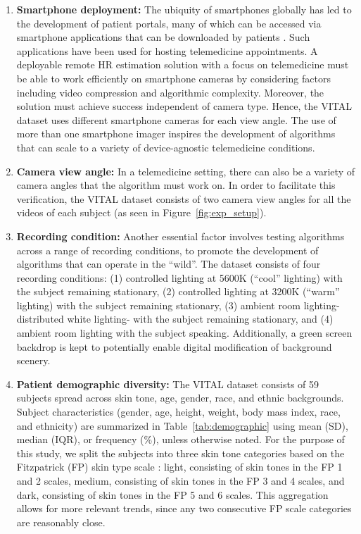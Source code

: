 \begin{enumerate}[label=(\roman*)]
    \item \textbf{Smartphone deployment:} The ubiquity of smartphones globally has led to the development of patient portals, many of which can be accessed via smartphone applications that can be downloaded by patients \cite{mosa_systematic_2012,ventola_mobile_2014,boulos_how_2011}. Such applications have been used for hosting telemedicine appointments. A deployable remote HR estimation solution with a focus on telemedicine must be able to work efficiently on smartphone cameras by considering factors including video compression \cite{yu_remote_2019,nowara_systematic_2021,nowara_combating_2019} and algorithmic complexity. Moreover, the solution must achieve success independent of camera type. Hence, the VITAL dataset uses different smartphone cameras for each view angle. The use of more than one smartphone imager inspires the development of algorithms that can scale to a variety of device-agnostic telemedicine conditions. 
    \item \textbf{Camera view angle:} In a telemedicine setting, there can also be a variety of camera angles that the algorithm must work on. In order to facilitate this verification, the VITAL dataset consists of two camera view angles for all the videos of each subject (as seen in Figure~\ref{fig:exp_setup}).
    \item \textbf{Recording condition:} Another essential factor involves testing algorithms across a range of recording conditions, to promote the development of algorithms that can operate in the “wild”. The dataset consists of four recording conditions: (1) controlled lighting at 5600K (“cool” lighting) with the subject remaining stationary, (2) controlled lighting at 3200K (“warm” lighting) with the subject remaining stationary, (3) ambient room lighting- distributed white lighting- with the subject remaining stationary, and (4) ambient room lighting with the subject speaking. Additionally, a green screen backdrop is kept to potentially enable digital modification of background scenery.
    \item \textbf{Patient demographic diversity:} The VITAL dataset consists of 59 subjects spread across skin tone, age, gender, race, and ethnic backgrounds. Subject characteristics (gender, age, height, weight, body mass index, race, and ethnicity) are summarized in Table~\ref{tab:demographic} using mean (SD), median (IQR), or frequency (\%), unless otherwise noted. For the purpose of this study, we split the subjects into three skin tone categories based on the Fitzpatrick (FP) skin type scale \cite{fitzpatrick_validity_1988}: light, consisting of skin tones in the FP 1 and 2 scales, medium, consisting of skin tones in the FP 3 and 4 scales, and dark, consisting of skin tones in the FP 5 and 6 scales. This aggregation allows for more relevant trends, since any two consecutive FP scale categories are reasonably close.
\end{enumerate}

